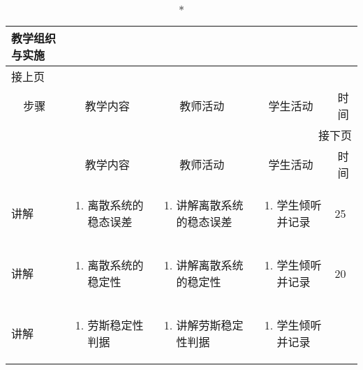 {%
\begin{landscape}

\begin{longtable}{|m{10mm}|m{50mm}|m{50mm}|m{50mm}|m{15mm}|}
\caption*{\huge 教学组织与实施}\\
\hline
\endfirsthead
\multicolumn{5}{l}{\small 接上页}\\
\hline
\multicolumn{1}{|c|}{步骤}&\multicolumn{1}{c|}{教学内容}&\multicolumn{1}{c|}{教师活动}&\multicolumn{1}{c|}{学生活动}&\multicolumn{1}{c|}{时间}\\
\hline
\endhead

\multicolumn{5}{r}{\small 接下页}\\
\endfoot
\hline
\endlastfoot
\multicolumn{1}{|c|}{步骤}&\multicolumn{1}{c|}{教学内容}&\multicolumn{1}{c|}{教师活动}&\multicolumn{1}{c|}{学生活动}&\multicolumn{1}{c|}{时间}\\\hline
讲解&\begin{enumerate}
\item 离散系统的稳态误差
\end{enumerate} &\begin{enumerate}
\item 讲解离散系统的稳态误差
\end{enumerate} &\begin{enumerate}
\item 学生倾听并记录
\end{enumerate} &25\\\hline
讲解&\begin{enumerate}
\item 离散系统的稳定性
\end{enumerate}
 &\begin{enumerate}
\item 讲解离散系统的稳定性
\end{enumerate} &\begin{enumerate}
\item 学生倾听并记录
\end{enumerate} &20 \\\hline
讲解&\begin{enumerate}
\item 劳斯稳定性判据
\end{enumerate}
&\begin{enumerate}
\item 讲解劳斯稳定性判据
\end{enumerate} &\begin{enumerate}
\item 学生倾听并记录

\end{enumerate}
\end{longtable}
\end{landscape}}
